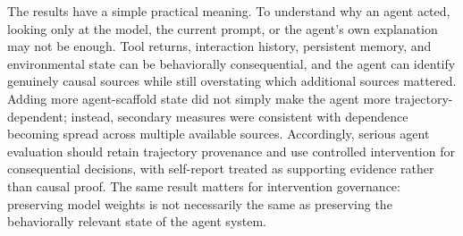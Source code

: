 \documentclass[conference]{IEEEtran}
\begin{document}
The results have a simple practical meaning. To understand why an agent acted, looking only at the model, the current prompt, or the agent's own explanation may not be enough. Tool returns, interaction history, persistent memory, and environmental state can be behaviorally consequential, and the agent can identify genuinely causal sources while still overstating which additional sources mattered. Adding more agent-scaffold state did not simply make the agent more trajectory-dependent; instead, secondary measures were consistent with dependence becoming spread across multiple available sources. Accordingly, serious agent evaluation should retain trajectory provenance and use controlled intervention for consequential decisions, with self-report treated as supporting evidence rather than causal proof. The same result matters for intervention governance: preserving model weights is not necessarily the same as preserving the behaviorally relevant state of the agent system.
\end{document}
